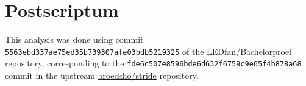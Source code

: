 \documentclass{acmart}
\begin{document}
\section{Postscriptum}

This analysis was done using commit \texttt{5563ebd337ae75ed35b739307afe03bdb5219325} of the \href{https://github.com/LEDfan/Bachelorproef}{LEDfan/Bachelorproef} repository, corresponding to the \texttt{fde6c507e8596bde6d632f6759c9e65f4b878a68} commit in the upstream \href{https://github.com/broeckho/stride}{broeckho/stride} repository.

\clearpage



\end{document}
